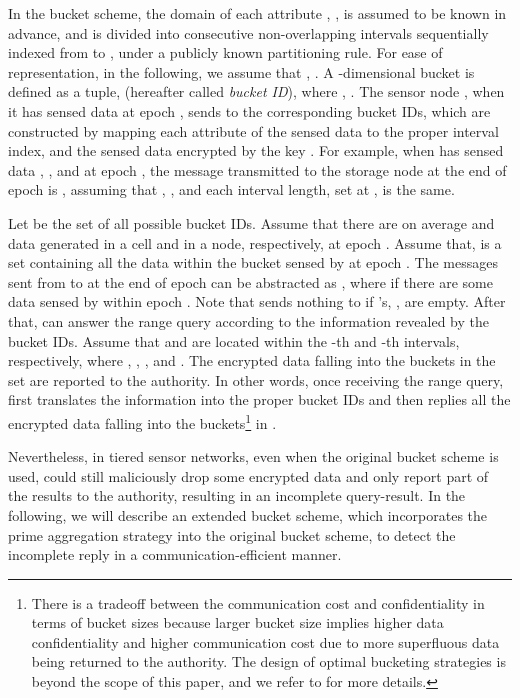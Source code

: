 \documentclass[conference]{IEEEtran}
\begin{document}
In the bucket scheme, the domain of each attribute , , is assumed to be known in advance, and is divided into  consecutive non-overlapping intervals sequentially indexed from  to , under a publicly known partitioning rule. For ease of representation, in the following, we assume that , . A -dimensional bucket is defined as a tuple,  (hereafter called \emph{bucket ID}), where , . The sensor node , when it has sensed data at epoch ,  sends to  the corresponding bucket IDs, which are constructed by mapping each attribute of the sensed data to the proper interval index, and the sensed data encrypted by the key . For example, when  has sensed data , , and  at epoch , the message transmitted to the storage node at the end of epoch  is , assuming that , , and each interval length, set at , is the same.

Let  be the set of all possible bucket IDs. Assume that there are on average  and  data generated in a cell and in a node, respectively, at epoch . Assume that,  is a set containing all the data within the bucket  sensed by  at epoch . The messages sent from  to  at the end of epoch  can be abstracted as , where  if there are some data sensed by  within epoch . Note that  sends nothing to  if 's, , are empty. After that,  can answer the range query according to the information revealed by the bucket IDs. Assume that  and  are located within the -th and -th intervals, respectively, where , , , and . The encrypted data falling into the buckets in the set  are reported to the authority. In other words, once receiving the range query,  first translates the information  into the proper bucket IDs and then replies all the encrypted data falling into the buckets\footnote{There is a tradeoff between the communication cost and confidentiality in terms of bucket sizes because larger bucket size implies higher data confidentiality and higher communication cost due to more superfluous data being returned to the authority. The design of optimal bucketing strategies is beyond the scope of this paper, and we refer to \cite{hilm02,hmt04} for more details.} in .

Nevertheless, in tiered sensor networks, even when the original bucket scheme is used,  could still maliciously drop some encrypted data and only report part of the results to the authority, resulting in an incomplete query-result. In the following, we will describe an extended bucket scheme, which incorporates the prime aggregation strategy into the original bucket scheme, to detect the incomplete reply in a communication-efficient manner.
\end{document}
